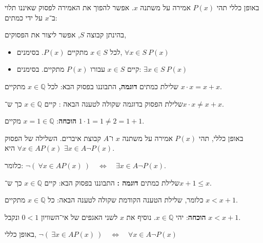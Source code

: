 \documentclass[aspectratio=169]{beamer}
\begin{document}
\begin{frame}
	באופן כללי תהי $P(x)$ אמירה על משתנה $x$. אפשר להפוך את האמירה
	לפסוק שאיננו תלוי ב־$x$ על ידי כמתים:

	בהינתן קבוצה $S$, אפשר ליצור את הפסוקים,
	\begin{itemize}
		\item לכל $x\in S$ מתקיים $P(x)$. בסימנים, $\forall x\in S\ P(x)$
		\item קיים $x\in S$ עבורו $P(x)$ מתקיים. בסימנים: $\exists x\in S\ P(x)$
	\end{itemize}
\end{frame}

\begin{frame}{שלילת כמתים}
	\textbf{דוגמה, }התבוננו בפסוק הבא: לכל $x\in\mathbb{Q}$ מתקיים
	$x\cdot x=x+x$.\smallskip{}


	שלילת הפסוק בדוגמה שקולה לטענה הבאה\textbf{ }: קיים $x\in\mathbb{Q}$
	כך ש־$x\cdot x\neq x+x$.

	\textbf{הוכחה}: $x=1\in\mathbb{Q}$ מקיים $1\cdot1=1\neq2=1+1$. 

	באופן כללי, תהי $P(x)$ אמירה על משתנה $x$ ו־$A$ קבוצת
	איברים. השלילה של הפסוק $\forall x\in AP(x)$ היא $\exists x\in A\neg P(x)$. 

	כלומר: $\neg(\:\forall x\in AP(x)\:)\quad\iff\quad\exists x\in A\neg P(x)$.
\end{frame}

\begin{frame}{שלילת כמתים}
	\textbf{דוגמה :} התבוננו בפסוק הבא: קיים $x\in\mathbb{Q}$
	כך ש־$x+1\leqslant x$.\smallskip{}


	כלומר, שלילת הטענה הקודמת שקולה לטענה הבאה: כל $x\in\mathbb{Q}$
	מתקיים $x<x+1$.

	\textbf{הוכחה}: יהי $x\in\mathbb{Q}$. נוסיף את $x$ לשני האגפים של אי־השוויון $0<1$ ונקבל $x<x+1$.

	באופן כללי, $\neg(\:\exists x\in AP(x)\:)\quad\iff\quad\forall x\in A\neg P(x)$
\end{frame}
\end{document}
